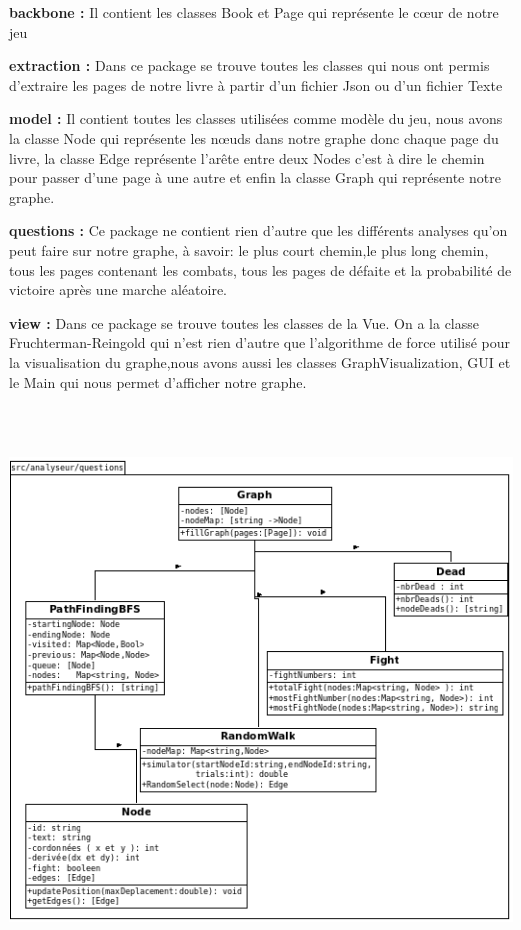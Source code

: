 \documentclass[12pt]{article}
\begin{document}
\vspace{12pt plus 5pt minus 5pt}

\textbf{backbone :} Il contient les classes Book et Page qui représente le cœur de notre jeu
\vspace{12pt plus 5pt minus 5pt}

\textbf{extraction :} Dans ce package se trouve toutes les classes qui nous ont permis d'extraire les pages de notre livre à partir d'un fichier Json ou d'un fichier Texte

\vspace{12pt plus 5pt minus 5pt}

\textbf{model :} Il contient toutes les classes utilisées comme modèle du jeu, nous avons la classe Node qui représente les nœuds dans notre graphe donc chaque page du livre, la classe Edge représente l'arête entre deux Nodes c'est à dire le chemin pour passer d'une page à une autre et enfin la classe Graph qui représente notre graphe.

\vspace{12pt plus 5pt minus 5pt}

\textbf{questions :} Ce package ne contient rien d'autre que les différents analyses qu'on peut faire sur notre graphe, à savoir: le plus court chemin,le plus long chemin, tous les pages contenant les combats, tous les pages de défaite et la probabilité de victoire après une marche aléatoire.

\vspace{12pt plus 5pt minus 5pt}

\textbf{view :} Dans ce package se trouve toutes les classes de la Vue. On a la classe Fruchterman-Reingold qui n'est rien d'autre que l'algorithme de force utilisé pour la visualisation du graphe,nous avons aussi les classes GraphVisualization, GUI et le Main qui nous permet d'afficher notre graphe.

\includegraphics[width=15 cm,height=15cm]{images/Diagramme1.png}
\end{document}
